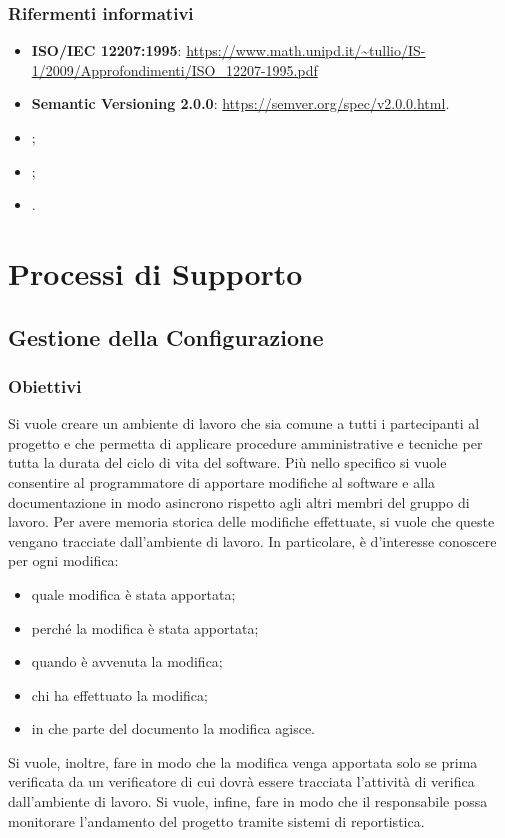 \documentclass[]{article}
\begin{document}
			\subsubsection{Rifermenti informativi}
			\begin{itemize}
				\item \textbf{ISO/IEC 12207:1995}: \url{https://www.math.unipd.it/~tullio/IS-1/2009/Approfondimenti/ISO_12207-1995.pdf}
				\item \textbf{Semantic Versioning 2.0.0}: \url{https://semver.org/spec/v2.0.0.html}.
				\item \textbf{};
				\item \textbf{};
				\item \textbf{}.
			\end{itemize}

	\newpage

	\section{Processi di Supporto}
		\subsection{Gestione della Configurazione}
			\subsubsection{Obiettivi}
			Si vuole creare un ambiente di lavoro che sia comune a tutti i partecipanti al progetto e che permetta di applicare procedure amministrative e tecniche per tutta la durata del ciclo di vita del software. Più nello specifico si vuole consentire al programmatore di apportare modifiche al software e alla documentazione in modo asincrono rispetto agli altri membri del gruppo di lavoro. Per avere memoria storica delle modifiche effettuate, si vuole che queste vengano tracciate dall'ambiente di lavoro. In particolare, è d'interesse conoscere per ogni modifica:
			\begin{itemize}
				\item quale modifica è stata apportata;
				\item perché la modifica è stata apportata;
				\item quando è avvenuta la modifica;
				\item chi ha effettuato la modifica;
				\item in che parte del documento la modifica agisce.
			\end{itemize}
			Si vuole, inoltre, fare in modo che la modifica venga apportata solo se prima verificata da un verificatore di cui dovrà essere tracciata l'attività di verifica dall'ambiente di lavoro. Si vuole, infine, fare in modo che il responsabile possa monitorare l'andamento del progetto tramite sistemi di reportistica.
\end{document}
